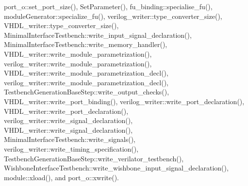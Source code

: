port\+\_\+o\+::set\+\_\+port\+\_\+size(), Set\+Parameter(), fu\+\_\+binding\+::specialise\+\_\+fu(), module\+Generator\+::specialize\+\_\+fu(), verilog\+\_\+writer\+::type\+\_\+converter\+\_\+size(), V\+H\+D\+L\+\_\+writer\+::type\+\_\+converter\+\_\+size(), Minimal\+Interface\+Testbench\+::write\+\_\+input\+\_\+signal\+\_\+declaration(), Minimal\+Interface\+Testbench\+::write\+\_\+memory\+\_\+handler(), V\+H\+D\+L\+\_\+writer\+::write\+\_\+module\+\_\+parametrization(), verilog\+\_\+writer\+::write\+\_\+module\+\_\+parametrization(), V\+H\+D\+L\+\_\+writer\+::write\+\_\+module\+\_\+parametrization\+\_\+decl(), verilog\+\_\+writer\+::write\+\_\+module\+\_\+parametrization\+\_\+decl(), Testbench\+Generation\+Base\+Step\+::write\+\_\+output\+\_\+checks(), V\+H\+D\+L\+\_\+writer\+::write\+\_\+port\+\_\+binding(), verilog\+\_\+writer\+::write\+\_\+port\+\_\+declaration(), V\+H\+D\+L\+\_\+writer\+::write\+\_\+port\+\_\+declaration(), verilog\+\_\+writer\+::write\+\_\+signal\+\_\+declaration(), V\+H\+D\+L\+\_\+writer\+::write\+\_\+signal\+\_\+declaration(), Minimal\+Interface\+Testbench\+::write\+\_\+signals(), verilog\+\_\+writer\+::write\+\_\+timing\+\_\+specification(), Testbench\+Generation\+Base\+Step\+::write\+\_\+verilator\+\_\+testbench(), Wishbone\+Interface\+Testbench\+::write\+\_\+wishbone\+\_\+input\+\_\+signal\+\_\+declaration(), module\+::xload(), and port\+\_\+o\+::xwrite().

